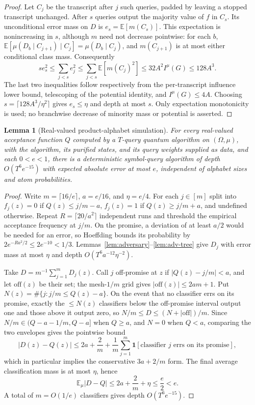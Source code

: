 \documentclass[11pt]{article}
\newtheorem{lemma}[theorem]{Lemma}
\theoremstyle{definition}\newtheorem{definition}[theorem]{Definition}
\theoremstyle{remark}\newtheorem{remark}[theorem]{Remark}
\newcommand{\E}{\mathbb E}\newcommand{\Prb}{\mathbb P}
\begin{document}
\begin{proof}
Let \(C_j\) be the transcript after \(j\) such queries, padded by leaving a stopped transcript unchanged. After \(s\) queries output the majority value of \(f\) in \(C_s\). Its unconditional error mass on \(D\) is \(e_s=\E[m(C_s)]\). This expectation is nonincreasing in \(s\), although \(m\) need not decrease pointwise: for each \(b\), \(\E[\mu(D_b\mid C_{j+1})\mid C_j]=\mu(D_b\mid C_j)\), and \(m(C_{j+1})\) is at most either conditional class mass. Consequently
\[
 se_s^2\le\sum_{j<s}e_j^2\le\sum_{j<s}\E[m(C_j)^2]\le32A^2I^\mu(G)\le128A^3.
\]
The last two inequalities follow respectively from the per-transcript influence lower bound, telescoping of the potential identity, and \(I^\mu(G)\le4A\). Choosing \(s=\lceil128A^3/\eta^2\rceil\) gives \(e_s\le\eta\) and depth at most \(s\). Only expectation monotonicity is used; no branchwise decrease of minority mass or potential is asserted.
\end{proof}

\begin{lemma}[Real-valued product-alphabet simulation]\label{lem:product-sim}
For every real-valued acceptance function \(Q\) computed by a \(T\)-query quantum algorithm on \((\Omega,\mu)\), with the algorithm, its purified states, and its query weights supplied as data, and each \(0<e<1\), there is a deterministic symbol-query algorithm of depth \(O(T^6e^{-15})\) with expected absolute error at most \(e\), independent of alphabet sizes and atom probabilities.
\end{lemma}
\begin{proof}
Write \(m=\lceil16/e\rceil\), \(a=e/16\), and \(\eta=e/4\). For each \(j\in[m]\) split into \(f_j(z)=0\) if \(Q(z)\le j/m-a\), \(f_j(z)=1\) if \(Q(z)\ge j/m+a\), and undefined otherwise. Repeat \(R=\lceil20/a^2\rceil\) independent runs and threshold the empirical acceptance frequency at \(j/m\). On the promise, a deviation of at least \(a/2\) would be needed for an error, so Hoeffding bounds its probability by \(2e^{-Ra^2/2}\le2e^{-10}<1/3\). Lemmas~\ref{lem:adversary}--\ref{lem:adv-tree} give \(D_j\) with error mass at most \(\eta\) and depth \(O(T^6a^{-12}\eta^{-2})\).

Take \(D=m^{-1}\sum_{j=1}^mD_j(z)\). Call \(j\) off-promise at \(z\) if \(|Q(z)-j/m|<a\), and let \(\mathrm{off}(z)\) be their set; the mesh-\(1/m\) grid gives \(|\mathrm{off}(z)|\le2am+1\). Put \(N(z)=\#\{j:j/m\le Q(z)-a\}\). On the event that no classifier errs on its promise, exactly the \(\le N(z)\) classifiers below the off-promise interval output one and those above it output zero, so \(N/m\le D\le(N+|\mathrm{off}|)/m\). Since \(N/m\in(Q-a-1/m,Q-a]\) when \(Q\ge a\), and \(N=0\) when \(Q<a\), comparing the two envelopes gives the pointwise bound
\[
 |D(z)-Q(z)|\le2a+\frac2m+\frac1m\sum_{j=1}^m\mathbf 1[\text{classifier }j\text{ errs on its promise}],
\]
which in particular implies the conservative \(3a+2/m\) form. The final average classification mass is at most \(\eta\), hence
\[
 \E_\mu|D-Q|\le2a+\frac2m+\eta\le\frac e2<e.
\]
A total of \(m=O(1/e)\) classifiers gives depth \(O(T^6e^{-15})\).
\end{proof}
\end{document}
